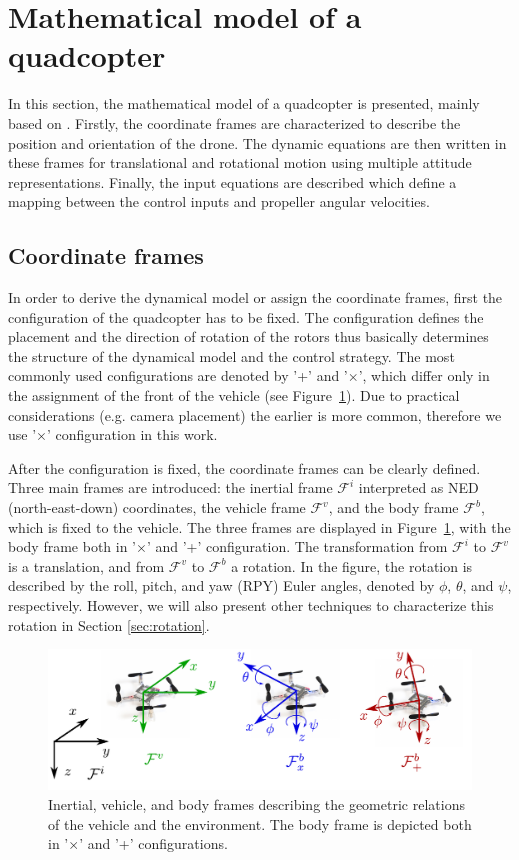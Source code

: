 \section{Mathematical model of a quadcopter}\label{sec:model}
In this section, the mathematical model of a quadcopter is presented, mainly based on \cite{quad_model}. Firstly, the coordinate frames are characterized to describe the position and orientation of the drone. The dynamic equations are then written in these frames for translational and rotational motion using multiple attitude representations. Finally, the input equations are described which define a mapping between the control inputs and propeller angular velocities.

\subsection{Coordinate frames}\label{sec:frames}
In order to derive the dynamical model or assign the coordinate frames, first the configuration of the quadcopter has to be fixed. The configuration defines the placement and the direction of rotation of the rotors thus basically determines the structure of the dynamical model and the control strategy. The most commonly used configurations are denoted by '+' and '$\times$', which differ only in the assignment of the front of the vehicle (see Figure~\ref{fig:frames}). Due to practical considerations (e.g. camera placement) the earlier is more common, therefore we use '$\times$' configuration in this work.

After the configuration is fixed, the coordinate frames can be clearly defined. Three main frames are introduced: the inertial frame $\mathcal{F}^i$ interpreted as NED (north-east-down) coordinates, the vehicle frame $\mathcal{F}^v$, and the body frame $\mathcal{F}^b$, which is fixed to the vehicle. The three frames are displayed in Figure~\ref{fig:frames}, with the body frame both in '$\times$' and '+' configuration. The transformation from $\mathcal{F}^i$ to $\mathcal{F}^v$ is a translation, and from $\mathcal{F}^v$ to $\mathcal{F}^b$ a rotation. In the figure, the rotation is described by the roll, pitch, and yaw (RPY) Euler angles, denoted by $\phi$, $\theta$, and $\psi$, respectively. However, we will also present other techniques to characterize this rotation in Section \ref{sec:rotation}.

\begin{figure}[b]
\centering 
\includegraphics[width=.75\textwidth]{Fig/xconf.pdf}
\caption[Inertial, vehicle, and body frames]{Inertial, vehicle, and body frames describing the geometric relations of the vehicle and the environment. The body frame is depicted both in '$\times$' and '+' configurations.}\label{fig:frames}
\end{figure}

